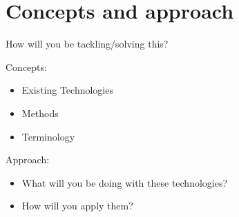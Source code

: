 \section{Concepts and approach
}

How will you be tackling/solving this?

Concepts:
\begin{itemize}
\item Existing Technologies
\item Methods
\item Terminology
\end{itemize}

Approach:
\begin{itemize}
\item What will you be doing with these technologies?
\item How will you apply them?
\end{itemize}